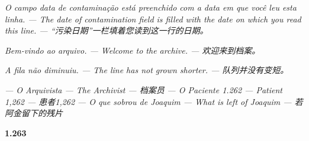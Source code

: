 \documentclass[14pt,openany]{extbook}
\begin{document}
\begin{center}
\noindent\textit{O campo \textquotedbl{}data de contaminação\textquotedbl{} está preenchido com a data em que você leu esta linha. --- The \textquotedbl{}date of contamination\textquotedbl{} field is filled with the date on which you read this line. --- “污染日期”一栏填着您读到这一行的日期。}

\noindent\textit{Bem-vindo ao arquivo. --- Welcome to the archive. --- 欢迎来到档案。}

\noindent\textit{A fila não diminuiu. --- The line has not grown shorter. --- 队列并没有变短。}

\vspace{1.5em}

\noindent\textit{--- O Arquivista --- The Archivist --- 档案员}
\vspace{0.3em}
\noindent\textit{--- O Paciente 1.262 --- Patient 1,262 --- 患者1,262}
\vspace{0.3em}
\noindent\textit{--- O que sobrou de Joaquim --- What is left of Joaquim --- 若阿金留下的残片}

\vspace{2em}
\textcolor{olho}{\large \textbf{1.263}}

\end{center}
\vfill



\backmatter




\end{document}
